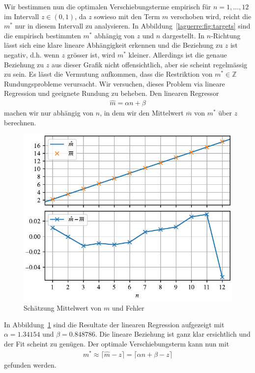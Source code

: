 Wir bestimmen nun die optimalen Verschiebungsterme empirisch
für $n = 1,\ldots, 12$ im Intervall $z \in (0, 1)$,
da $z$ sowieso mit den Term $m$ verschoben wird,
reicht die $m^*$ nur in diesem Intervall zu analysieren.
In Abbildung~\ref{laguerre:fig:targets} sind die empirisch bestimmten $m^*$
abhängig von $z$ und $n$ dargestellt.
In $n$-Richtung lässt sich eine klare lineare Abhängigkeit erkennen und
die Beziehung zu $z$ ist negativ,
d.h. wenn $z$ grösser ist, wird $m^*$ kleiner.
Allerdings ist die genaue Beziehung zu $z$
aus dieser Grafik nicht offensichtlich,
aber sie scheint regelmässig zu sein.
Es lässt die Vermutung aufkommen,
dass die Restriktion von $m^* \in \mathbb{Z}$ Rundungsprobleme verursacht.
Wir versuchen,
dieses Problem via lineare Regression und geeignete Rundung zu beheben.
Den linearen Regressor
\begin{align*}
\hat{m}
=
\alpha n + \beta
\end{align*}
machen wir nur abhängig von $n$,
in dem wir den Mittelwert $\overline{m}$ von $m^*$ über $z$ berechnen.

\begin{figure}
\centering
% 
\includegraphics{papers/laguerre/images/estimates.pdf}
\caption{Schätzung Mittelwert von $m$ und Fehler}
\label{laguerre:fig:schaetzung}
\end{figure}

In Abbildung~\ref{laguerre:fig:schaetzung} sind die Resultate
der linearen Regression aufgezeigt mit $\alpha = 1.34154$ und $\beta =
0.848786$.
Die lineare Beziehung ist ganz klar ersichtlich und der Fit scheint zu genügen.
Der optimale Verschiebungsterm kann nun mit
\begin{align*}
m^*
\approx
\lceil \hat{m} - z \rceil
=
\lceil \alpha n + \beta - z \rceil
\end{align*}
gefunden werden.

